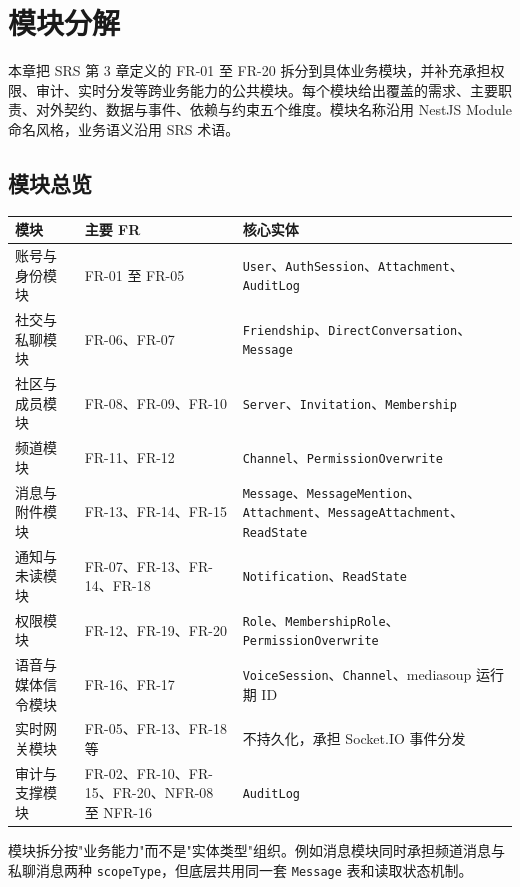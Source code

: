 \section{模块分解}

本章把 SRS 第 3 章定义的 FR-01 至 FR-20 拆分到具体业务模块，并补充承担权限、审计、实时分发等跨业务能力的公共模块。每个模块给出覆盖的需求、主要职责、对外契约、数据与事件、依赖与约束五个维度。模块名称沿用 NestJS Module 命名风格，业务语义沿用 SRS 术语。

\subsection{模块总览}

\noindent\begin{tabularx}{\textwidth}{L{3.4cm}L{2.4cm}Y}
  \toprule
  模块 & 主要 FR & 核心实体 \\
  \midrule
  账号与身份模块 & FR-01 至 FR-05 & \texttt{User}、\texttt{AuthSession}、\texttt{Attachment}、\texttt{AuditLog} \\
  社交与私聊模块 & FR-06、FR-07 & \texttt{Friendship}、\texttt{DirectConversation}、\texttt{Message} \\
  社区与成员模块 & FR-08、FR-09、FR-10 & \texttt{Server}、\texttt{Invitation}、\texttt{Membership} \\
  频道模块 & FR-11、FR-12 & \texttt{Channel}、\texttt{PermissionOverwrite} \\
  消息与附件模块 & FR-13、FR-14、FR-15 & \texttt{Message}、\texttt{MessageMention}、\texttt{Attachment}、\texttt{MessageAttachment}、\texttt{ReadState} \\
  通知与未读模块 & FR-07、FR-13、FR-14、FR-18 & \texttt{Notification}、\texttt{ReadState} \\
  权限模块 & FR-12、FR-19、FR-20 & \texttt{Role}、\texttt{MembershipRole}、\texttt{PermissionOverwrite} \\
  语音与媒体信令模块 & FR-16、FR-17 & \texttt{VoiceSession}、\texttt{Channel}、mediasoup 运行期 ID \\
  实时网关模块 & FR-05、FR-13、FR-18 等 & 不持久化，承担 Socket.IO 事件分发 \\
  审计与支撑模块 & FR-02、FR-10、FR-15、FR-20、NFR-08 至 NFR-16 & \texttt{AuditLog} \\
  \bottomrule
\end{tabularx}

模块拆分按"业务能力"而不是"实体类型"组织。例如消息模块同时承担频道消息与私聊消息两种 \texttt{scopeType}，但底层共用同一套 \texttt{Message} 表和读取状态机制。

